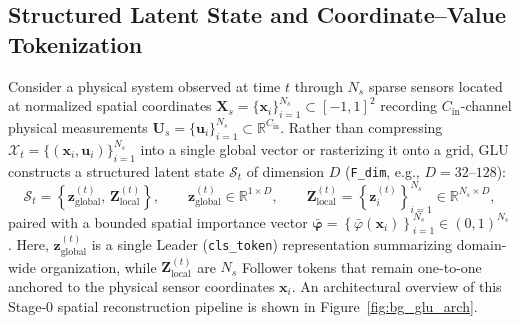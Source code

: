 \subsection{Structured Latent State and Coordinate--Value Tokenization}
\label{subsec:bg_glu_tokenization}

Consider a physical system observed at time $t$ through $N_s$ sparse sensors located at normalized spatial coordinates $\mathbf{X}_s = \{\mathbf{x}_i\}_{i=1}^{N_s} \subset [-1, 1]^2$ recording $C_{\text{in}}$-channel physical measurements $\mathbf{U}_s = \{\mathbf{u}_i\}_{i=1}^{N_s} \subset \mathbb{R}^{C_{\text{in}}}$. Rather than compressing $\mathcal{X}_t = \{(\mathbf{x}_i, \mathbf{u}_i)\}_{i=1}^{N_s}$ into a single global vector or rasterizing it onto a grid, GLU constructs a structured latent state $\mathcal{S}_t$ of dimension $D$ (\texttt{F\_dim}, e.g., $D = 32\text{--}128$):
\begin{equation}
    \mathcal{S}_t = \left\{\mathbf{z}_{\text{global}}^{(t)},\, \mathbf{Z}_{\text{local}}^{(t)}\right\}, \qquad \mathbf{z}_{\text{global}}^{(t)} \in \mathbb{R}^{1 \times D}, \qquad \mathbf{Z}_{\text{local}}^{(t)} = \left\{\mathbf{z}_i^{(t)}\right\}_{i=1}^{N_s} \in \mathbb{R}^{N_s \times D},
    \label{eq:bg_glu_latent_state}
\end{equation}
paired with a bounded spatial importance vector $\bar{\boldsymbol{\varphi}} = \left\{\bar{\varphi}(\mathbf{x}_i)\right\}_{i=1}^{N_s} \in (0, 1)^{N_s}$. Here, $\mathbf{z}_{\text{global}}^{(t)}$ is a single Leader (\texttt{cls\_token}) representation summarizing domain-wide organization, while $\mathbf{Z}_{\text{local}}^{(t)}$ are $N_s$ Follower tokens that remain one-to-one anchored to the physical sensor coordinates $\mathbf{x}_i$. An architectural overview of this Stage-0 spatial reconstruction pipeline is shown in Figure~\ref{fig:bg_glu_arch}.

